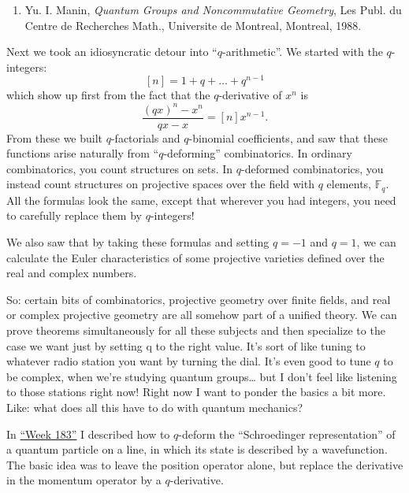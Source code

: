 \documentclass{article}
\def\tightlist{}
\begin{document}
\begin{enumerate}
\def\labelenumi{\arabic{enumi})}
\tightlist
\item
  Yu. I. Manin, \emph{Quantum Groups and Noncommutative Geometry}, Les
  Publ. du Centre de Recherches Math., Universite de Montreal, Montreal,
  1988.
\end{enumerate}

Next we took an idiosyncratic detour into ``\(q\)-arithmetic''. We
started with the \(q\)-integers: \[[n] = 1+q+\ldots+q^{n-1}\] which show
up first from the fact that the \(q\)-derivative of \(x^n\) is
\[\frac{(qx)^n-x^n}{qx-x} = [n]x^{n-1}.\] From these we built
\(q\)-factorials and \(q\)-binomial coefficients, and saw that these
functions arise naturally from ``\(q\)-deforming'' combinatorics. In
ordinary combinatorics, you count structures on sets. In \(q\)-deformed
combinatorics, you instead count structures on projective spaces over
the field with \(q\) elements, \(\mathbb{F}_q\). All the formulas look
the same, except that wherever you had integers, you need to carefully
replace them by \(q\)-integers!

We also saw that by taking these formulas and setting \(q = -1\) and
\(q = 1\), we can calculate the Euler characteristics of some projective
varieties defined over the real and complex numbers.

So: certain bits of combinatorics, projective geometry over finite
fields, and real or complex projective geometry are all somehow part of
a unified theory. We can prove theorems simultaneously for all these
subjects and then specialize to the case we want just by setting q to
the right value. It's sort of like tuning to whatever radio station you
want by turning the dial. It's even good to tune \(q\) to be complex,
when we're studying quantum groups\ldots{} but I don't feel like
listening to those stations right now! Right now I want to ponder the
basics a bit more. Like: what does all this have to do with quantum
mechanics?

In \protect\hyperlink{week183}{``Week 183''} I described how to
\(q\)-deform the ``Schroedinger representation'' of a quantum particle
on a line, in which its state is described by a wavefunction. The basic
idea was to leave the position operator alone, but replace the
derivative in the momentum operator by a \(q\)-derivative.
\end{document}
